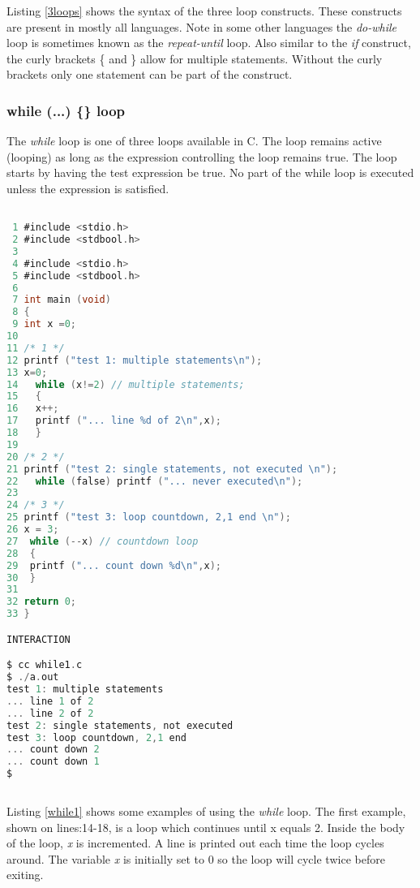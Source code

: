 Listing \ref{3loops} shows the syntax of the three loop constructs. These constructs are present in mostly all languages. Note in some other languages the \textit{do-while} loop is sometimes known as the \textit{repeat-until} loop. Also similar to the \textit{if} construct, the curly brackets \{ and \} allow for multiple statements. Without the curly brackets only one statement can be part of the construct.


\subsubsection{while (...) \{\} loop} \label{whileloop} 


The \textit{while} loop is one of three loops available in C. The loop remains active (looping) as long as the expression controlling the loop remains true. The loop starts by having the test expression be true. No part of the while loop is executed unless the expression is satisfied.

\begin{lstlisting}[language=C,showstringspaces=false,caption={File while1.c, while...loop base examples},captionpos=b,label=while1]

 1 #include <stdio.h>
 2 #include <stdbool.h>
 3 
 4 #include <stdio.h>
 5 #include <stdbool.h>
 6 
 7 int main (void)
 8 {
 9 int x =0;
10 
11 /* 1 */
12 printf ("test 1: multiple statements\n");
13 x=0;
14   while (x!=2) // multiple statements;
15   { 
16   x++;
17   printf ("... line %d of 2\n",x);
18   }  
19  
20 /* 2 */
21 printf ("test 2: single statements, not executed \n");
22   while (false) printf ("... never executed\n");
23  
24 /* 3 */
25 printf ("test 3: loop countdown, 2,1 end \n");
26 x = 3;
27  while (--x) // countdown loop
28  {
29  printf ("... count down %d\n",x);
30  }
31   
32 return 0;
33 }

INTERACTION

$ cc while1.c
$ ./a.out
test 1: multiple statements 
... line 1 of 2
... line 2 of 2
test 2: single statements, not executed 
test 3: loop countdown, 2,1 end 
... count down 2
... count down 1
$
    
\end{lstlisting}

Listing \ref{while1} shows some examples of using the \textit{while} loop. The first example, shown on lines:14-18, is a loop which continues until x equals 2. Inside the body of the loop, \textit{x} is incremented. A line is printed out each time the loop cycles around. The variable \textit{x} is initially set to 0 so the loop will cycle twice before exiting. 

